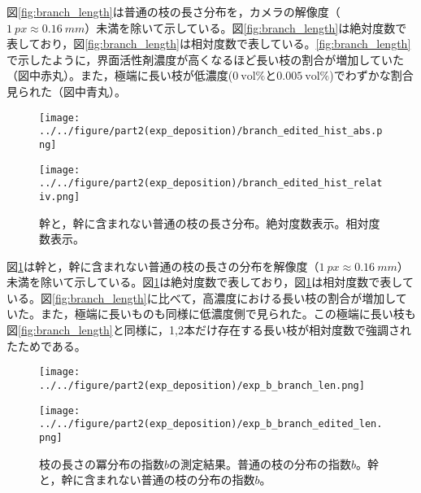 \documentclass[autodetect-engine,dvi=dvipdfmx,a4paper,ja=standard,oneside,openany,11pt]{bxjsbook}
\begin{document}
図\ref{fig:branch_length}は普通の枝の長さ分布を，カメラの解像度（$\SI{1}{px}\approx \SI{0.16}{mm}$）未満を除いて示している。図\ref{fig:branch_length}は絶対度数で表しており，図\ref{fig:branch_length}は相対度数で表している。\ref{fig:branch_length}で示したように，界面活性剤濃度が高くなるほど長い枝の割合が増加していた（図中赤丸）。また，極端に長い枝が低濃度($\SI{0}{\mathrm{vol}\%}$と$\SI{0.005}{\mathrm{vol}\%}$)でわずかな割合見られた（図中青丸）。

\begin{figure}[htbp]
  \begin{minipage}
    {0.45\textwidth}
    \subcaption{}
    \centering
    \texttt{[image: ../../figure/part2(exp\_deposition)/branch\_edited\_hist\_abs.png]}
    \label{fig:branch_length_absolute_edited}
  \end{minipage}
  \begin{minipage}
    {0.45\textwidth}
    \subcaption{}
    \centering
    \texttt{[image: ../../figure/part2(exp\_deposition)/branch\_edited\_hist\_relativ.png]}
    \label{fig:branch_length_relativ_edited}
  \end{minipage}
  \caption{幹と，幹に含まれない普通の枝の長さ分布。絶対度数表示。相対度数表示。}
  \label{fig:branch_length_edited}
\end{figure}

図\ref{fig:branch_length_edited}は幹と，幹に含まれない普通の枝の長さの分布を解像度（$\SI{1}{px}\approx \SI{0.16}{mm}$）未満を除いて示している。図\ref{fig:branch_length_edited}は絶対度数で表しており，図\ref{fig:branch_length_edited}は相対度数で表している。図\ref{fig:branch_length}に比べて，高濃度における長い枝の割合が増加していた。また，極端に長いものも同様に低濃度側で見られた。この極端に長い枝も図\ref{fig:branch_length}と同様に，1,2本だけ存在する長い枝が相対度数で強調されたためである。

\begin{figure}[htbp]
  \begin{minipage}
    {0.51\textwidth}
    \subcaption{}
    \centering
    \texttt{[image: ../../figure/part2(exp\_deposition)/exp\_b\_branch\_len.png]}
    \label{fig:exp_b_branch_len}
  \end{minipage}
  \begin{minipage}
    {0.49\textwidth}
    \subcaption{}
    \centering
    \texttt{[image: ../../figure/part2(exp\_deposition)/exp\_b\_branch\_edited\_len.png]}
    \label{fig:exp_b_branch_edited_len}
  \end{minipage}
  \caption{枝の長さの冪分布の指数$b$の測定結果。普通の枝の分布の指数$b$。幹と，幹に含まれない普通の枝の分布の指数$b$。}
  \label{fig:branch_length_exp}
\end{figure}
\end{document}
